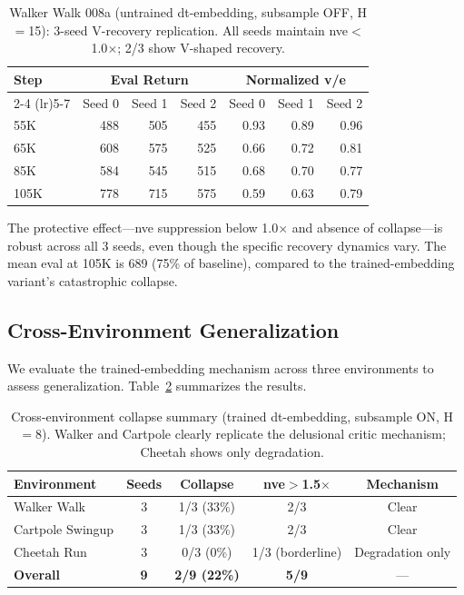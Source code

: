 \documentclass[letterpaper]{article}
\begin{document}
\begin{table}[t]
\centering
\caption{Walker Walk 008a (untrained dt-embedding, subsample OFF, H$=$15): 3-seed V-recovery replication. All seeds maintain nve$<$1.0$\times$; 2/3 show V-shaped recovery.}
\label{tab:008a}
\small
\begin{tabular}{lrrrrrr}
\toprule
Step & \multicolumn{3}{c}{Eval Return} & \multicolumn{3}{c}{Normalized v/e} \\
\cmidrule(lr){2-4} \cmidrule(lr){5-7}
& Seed 0 & Seed 1 & Seed 2 & Seed 0 & Seed 1 & Seed 2 \\
\midrule
55K & 488 & 505 & 455 & 0.93 & 0.89 & 0.96 \\
65K & 608 & 575 & 525 & 0.66 & 0.72 & 0.81 \\
85K & 584 & 545 & 515 & 0.68 & 0.70 & 0.77 \\
105K & 778 & 715 & 575 & 0.59 & 0.63 & 0.79 \\
\bottomrule
\end{tabular}
\end{table}

The protective effect---nve suppression below 1.0$\times$ and absence of collapse---is robust across all 3 seeds, even though the specific recovery dynamics vary.
The mean eval at 105K is 689 (75\% of baseline), compared to the trained-embedding variant's catastrophic collapse.

\subsection{Cross-Environment Generalization}
\label{sec:results_crossenv}

We evaluate the trained-embedding mechanism across three environments to assess generalization.
Table~\ref{tab:crossenv_summary} summarizes the results.

\begin{table}[t]
\centering
\caption{Cross-environment collapse summary (trained dt-embedding, subsample ON, H$=$8). Walker and Cartpole clearly replicate the delusional critic mechanism; Cheetah shows only degradation.}
\label{tab:crossenv_summary}
\small
\begin{tabular}{lcccc}
\toprule
\textbf{Environment} & \textbf{Seeds} & \textbf{Collapse} & \textbf{nve$>$1.5$\times$} & \textbf{Mechanism} \\
\midrule
Walker Walk & 3 & 1/3 (33\%) & 2/3 & Clear \\
Cartpole Swingup & 3 & 1/3 (33\%) & 2/3 & Clear \\
Cheetah Run & 3 & 0/3 (0\%) & 1/3 (borderline) & Degradation only \\
\midrule
\textbf{Overall} & \textbf{9} & \textbf{2/9 (22\%)} & \textbf{5/9} & --- \\
\bottomrule
\end{tabular}
\end{table}
\end{document}
